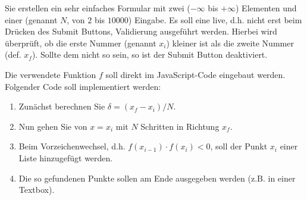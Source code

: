 %
\par Sie erstellen ein sehr einfaches Formular mit zwei  ($-\infty$ bis $+\infty$) Elementen und einer  (genannt $N$, von $2$ bis $10000$) Eingabe. Es soll eine live, d.h. nicht erst beim Drücken des Submit Buttons, Validierung ausgeführt werden. Hierbei wird überprüft, ob die erste Nummer (genannt $x_i$) kleiner ist als die zweite Nummer (def. $x_f$). Sollte dem nicht so sein, so ist der Submit Button deaktiviert.
%
\par Die verwendete Funktion $f$ soll direkt im JavaScript-Code eingebaut werden. Folgender Code soll implementiert werden:
%
\begin{enumerate}
\item Zunächst berechnen Sie $\delta = (x_f - x_i)/N$.
\item Nun gehen Sie von $x=x_i$ mit $N$ Schritten in Richtung $x_f$.
\item Beim Vorzeichenwechsel, d.h. $f(x_{i - 1}) \cdot f(x_i) < 0$, soll der Punkt $x_i$ einer Liste hinzugefügt werden.
\item Die so gefundenen Punkte sollen am Ende ausgegeben werden (z.B. in einer Textbox).
\end{enumerate}